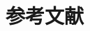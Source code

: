\documentclass[final,12pt]{elsarticle}
\begin{document}

\clearpage

\section*{参考文献}





 

\end{document}
